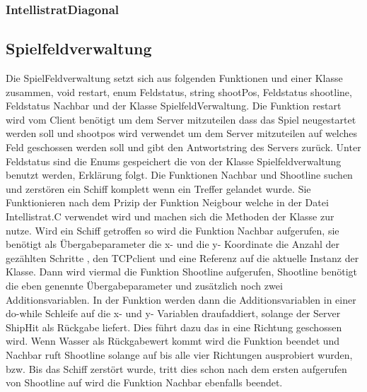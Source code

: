 \subsubsection*{IntellistratDiagonal}

\subsection*{Spielfeldverwaltung}

Die SpielFeldverwaltung setzt sich aus folgenden Funktionen und einer Klasse zusammen,
void restart, enum Feldstatus, string shootPos, Feldstatus shootline, Feldstatus Nachbar und der Klasse SpielfeldVerwaltung.
Die Funktion restart wird vom Client benötigt um dem Server mitzuteilen dass das Spiel neugestartet werden soll und shootpos wird verwendet um dem Server mitzuteilen auf welches Feld geschossen werden soll und gibt den Antwortstring des Servers zurück. Unter Feldstatus sind die Enums gespeichert die von der Klasse Spielfeldverwaltung benutzt werden, Erklärung folgt. Die Funktionen Nachbar und Shootline suchen und zerstören ein Schiff komplett wenn ein Treffer gelandet wurde. Sie Funktionieren nach dem Prizip der Funktion Neigbour welche in der Datei Intellistrat.C verwendet wird und machen sich die Methoden der Klasse zur nutze. Wird ein Schiff getroffen so wird die Funktion Nachbar aufgerufen, sie benötigt als Übergabeparameter die x- und die y- Koordinate die Anzahl der gezählten Schritte , den TCPclient und eine Referenz auf die aktuelle Instanz der Klasse. Dann wird viermal die Funktion Shootline aufgerufen, Shootline benötigt die eben genennte Übergabeparameter und zusätzlich noch zwei Additionsvariablen. In der Funktion werden dann die Additionsvariablen in einer do-while Schleife auf die x- und y- Variablen draufaddiert, solange der Server ShipHit als Rückgabe liefert. Dies führt dazu das in eine Richtung geschossen wird. Wenn Wasser als Rückgabewert kommt wird die Funktion beendet und Nachbar ruft Shootline solange auf bis alle vier Richtungen ausprobiert wurden, bzw. Bis das Schiff zerstört wurde, tritt dies schon nach dem ersten aufgerufen von Shootline auf wird die Funktion Nachbar ebenfalls beendet.

